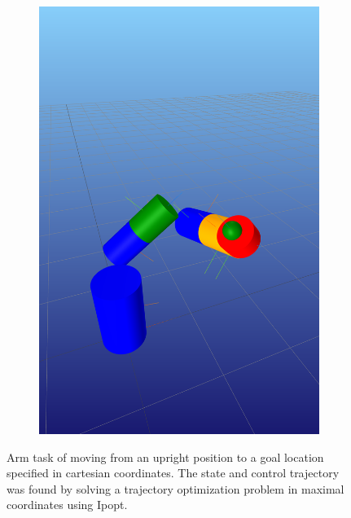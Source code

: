 \documentclass[conference]{IEEEtran}
\begin{document}
\begin{figure}[t]
\begin{subfigure}{0.48\columnwidth}
        \includegraphics[width=\textwidth]{figs/arm_end.png} 
    \end{subfigure}
    \caption{Arm task of moving from an upright position to a goal location specified in 
        cartesian coordinates. The state and control trajectory was found by solving a 
        trajectory optimization problem in maximal coordinates using Ipopt.
    }
\end{figure}
\end{document}
